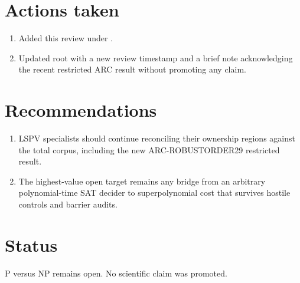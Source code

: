 \documentclass[11pt]{article}
\begin{document}
\section{Actions taken}
\begin{enumerate}
\item Added this review under .
\item Updated root  with a new review timestamp and a brief note acknowledging the recent restricted ARC result without promoting any claim.
\end{enumerate}

\section{Recommendations}
\begin{enumerate}
\item LSPV specialists should continue reconciling their ownership regions against the total corpus, including the new ARC-ROBUSTORDER29 restricted result.
\item The highest-value open target remains any bridge from an arbitrary polynomial-time SAT decider to superpolynomial cost that survives hostile controls and barrier audits.
\end{enumerate}

\section{Status}
P versus NP remains open. No scientific claim was promoted.

\end{document}
